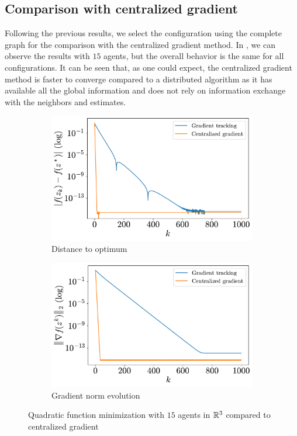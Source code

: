 \documentclass[a4paper,11pt,oneside]{book}
\begin{document}
\subsection{Comparison with centralized gradient}

Following the previous results, we select the configuration using the complete graph for the comparison with the centralized gradient method. In , we can observe the results with $15$ agents, but the overall behavior is the same for all configurations. It can be seen that, as one could expect, the centralized gradient method is faster to converge compared to a distributed algorithm as it has available all the global information and does not rely on information exchange with the neighbors and estimates.

\begin{figure}[htb!]
      \centering
      \begin{subfigure}[t]{0.46\linewidth}
            \centering
            \includegraphics[width=\linewidth]{./figs/quadratic/centralized/distance.pdf} 
            \caption{Distance to optimum}
      \end{subfigure}
      \hfill
      \begin{subfigure}[t]{0.46\linewidth}
            \centering
            \includegraphics[width=\linewidth]{./figs/quadratic/centralized/gradient.pdf} 
            \caption{Gradient norm evolution}
      \end{subfigure}
      \caption{Quadratic function minimization with $15$ agents in ${\mathbb{R}}^{3}$ compared to centralized gradient}
      \label{fig:quadratic_centralized_15_3}
\end{figure}
\end{document}
